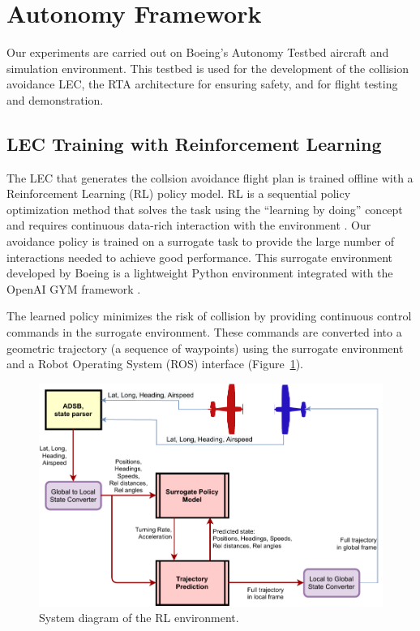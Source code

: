 \section{Autonomy Framework}

Our experiments are carried out on Boeing's Autonomy Testbed aircraft and simulation environment.  This testbed is used for the development of the collision avoidance LEC, the RTA architecture for ensuring safety, and for flight testing and demonstration.  



\subsection{LEC Training with Reinforcement Learning}

The LEC that generates the collsion avoidance flight plan is trained offline with a 
Reinforcement Learning (RL) policy model. 
RL is a sequential policy optimization method that solves the task using the ``learning by doing'' concept and requires continuous data-rich interaction with the environment \cite{sutton2018reinforcement}. 
Our avoidance policy is trained on a surrogate task to provide the large number of interactions needed to achieve good performance. 
This surrogate environment developed by Boeing is a lightweight Python environment integrated with the OpenAI GYM framework \cite{brockman2016openai}.

The learned policy minimizes the risk of collision by providing continuous control commands in the surrogate environment. These commands are converted into a geometric trajectory (a sequence of waypoints) using the surrogate environment and a Robot Operating System (ROS) interface (Figure~\ref{fig:diagram}).

\begin{figure}[h]
	\centering
	\includegraphics[width=\linewidth]{figures/system_overview.pdf}
	\caption{System diagram of the RL environment.}
	\label{fig:diagram}
\end{figure}


